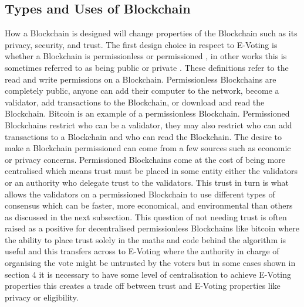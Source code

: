 \documentclass{llncs}
\begin{document}
\subsection{Types and Uses of Blockchain}
How a Blockchain is designed will change properties of the Blockchain such as its privacy, security, and trust. The first design choice in respect to E-Voting is whether a Blockchain is permissionless or permissioned \cite{wust2018need}, in other works this is sometimes referred to as being public or private \cite{blockchainBeginners}. These definitions refer to the read and write permissions on a Blockchain. 
Permissionless Blockchains are completely public, anyone can add their computer to the network, become a validator, add transactions to the Blockchain, or download and read the Blockchain. Bitcoin is an example of a permissionless Blockchain.
Permissioned Blockchains restrict who can be a validator, they may also restrict who can add transactions to a Blockchain and who can read the Blockchain. The desire to make a Blockchain permissioned can come from a few sources such as economic or privacy concerns. Permissioned Blockchains come at the cost of being more centralised which means trust must be placed in some entity either the validators or an authority who delegate trust to the validators. This trust in turn is what allows the validators on a permissioned Blockchain to use different types of consensus which can be faster, more economical, and environmental than others as discussed in the next subsection.
This question of not needing trust \cite{lemieux2016trusting} is often raised as a positive for decentralised permissionless Blockchains like bitcoin where the ability to place trust solely in the maths and code behind the algorithm is useful and this transfers across to E-Voting where the authority in charge of organising the vote might be untrusted by the voters but in some cases shown in section 4 it is necessary to have some level of centralisation to achieve E-Voting properties this creates a trade off between trust and E-Voting properties like privacy or eligibility.

\end{document}
